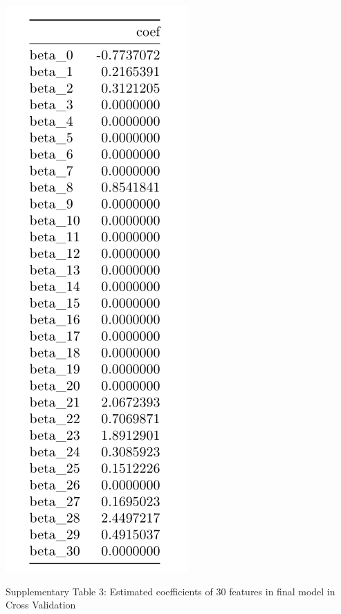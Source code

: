 \documentclass[]{article}
\begin{document}
\begin{center}
\includegraphics{./results/30 coefs when lambda=0.03.png}
\end{center}

\begin{center}
Supplementary Table 3: Estimated coefficients of 30 features in final model in Cross Validation
\end{center}
\end{document}
